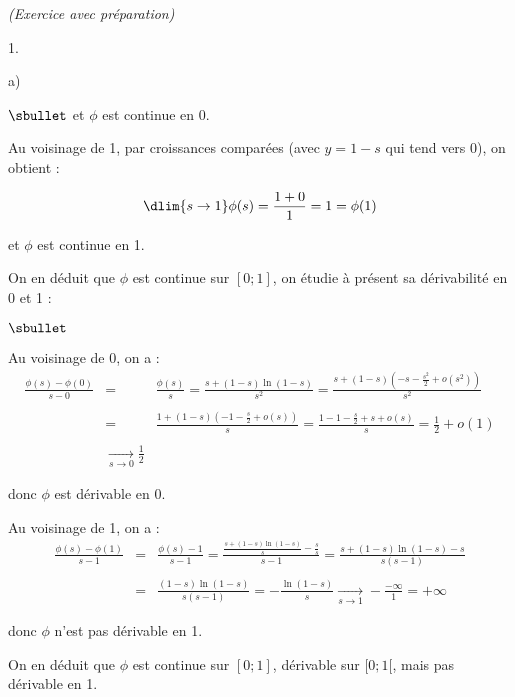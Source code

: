 \documentclass[11pt]{article}%
\begin{document}
\begin{exercice}{\it (Exercice avec préparation)}
\begin{noliste}{1.}
\begin{noliste}{a)}
\begin{noliste}{$\sbullet$}
 et $\phi$ est continue en 0. \\

 \item Au voisinage de 1, par croissances comparées (avec $y = 1-s$ qui
tend vers 0), on obtient : 
 
\[
 \dlim{ s \rightarrow 1 } \phi (s) = \frac{ 1 + 0 }{ 1 } = 1 = \phi (1)
\]


 et $\phi$ est continue en 1.

 \end{noliste}

 On en déduit que $\phi$ est continue sur $[0;1]$, on étudie à présent
sa dérivabilité en 0 et 1 : \begin{noliste}{$\sbullet$}

 \item Au voisinage de 0, on a : 
 \begin{eqnarray*}
 \frac{ \phi (s) - \phi (0) }{ s - 0 } & = & \frac{ \phi (s) }{ s } =
\frac{ s + (1-s) \ln (1-s) }{ s^{2} } = \frac{ s + (1-s) \left( - s -
\frac{ s^{2} }{ 2 } + o(s^{2} ) \right) }{ s^{2} } \\
\\
 & = & \frac{ 1 + (1-s) \left( - 1 - \frac{ s }{ 2 } + o(s ) \right) }{
s } = \frac{ 1 - 1 - \frac{ s }{ 2 } + s + o(s) }{ s } = \frac{ 1 }{ 2
} + o(1 ) \\
\\
 & \xrightarrow[ s \rightarrow 0]{} \frac{ 1 }{ 2 } 
 \end{eqnarray*}

 donc $\phi$ est dérivable en 0. \\

 \item Au voisinage de 1, on a :
 \begin{eqnarray*}
 \frac{ \phi (s) - \phi (1) }{ s - 1 } & = & \frac{ \phi (s) - 1 }{ s -
1 } = \frac{ \frac{ s + (1-s) \ln (1-s) }{ s } - \frac{ s }{ s } }{ s -
1 } = \frac{ s + (1-s) \ln (1-s) - s }{ s (s-1) } \\
\\
 & = & \frac{ (1-s) \ln (1-s) }{ s (s-1) } = - \frac{ \ln (1-s) }{ s }
\xrightarrow[ s \rightarrow 1 ]{} - \frac{ - \infty }{ 1 } = + \infty 
 \end{eqnarray*}

 donc $\phi$ n'est pas dérivable en 1.

 \end{noliste}

 On en déduit que $\phi$ est continue sur $[0;1]$, dérivable sur
$[0;1[$, mais pas dérivable en 1. \\


\end{noliste}
\end{noliste}
\end{exercice}
\end{document}
